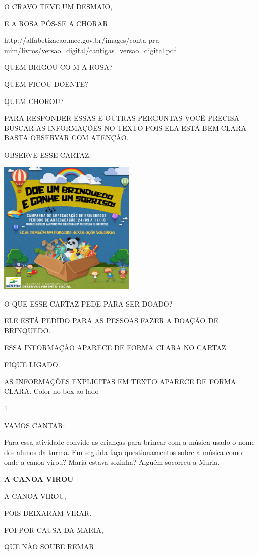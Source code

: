 {{{O CRAVO TEVE UM DESMAIO,

E A ROSA PÔS-SE A
CHORAR.

http://alfabetizacao.mec.gov.br/images/conta-pra-mim/livros/versao\_digital/cantigas\_versao\_digital.pdf

QUEM BRIGOU CO M A ROSA?

QUEM FICOU DOENTE?

QUEM CHOROU?

PARA RESPONDER ESSAS E OUTRAS PERGUNTAS VOCÊ PRECISA BUSCAR AS
INFORMAÇÕES NO TEXTO POIS ELA ESTÁ BEM CLARA BASTA OBSERVAR COM ATENÇÃO.

OBSERVE ESSE CARTAZ:

\includegraphics[width=2.57847in,height=2.52847in]{media/image82.png}

O QUE ESSE CARTAZ PEDE PARA SER DOADO?

ELE ESTÁ PEDIDO PARA AS PESSOAS FAZER A DOAÇÃO DE BRINQUEDO.

ESSA INFORMAÇÃO APARECE DE FORMA CLARA NO CARTAZ.

FIQUE LIGADO.

AS INFORMAÇÕES EXPLICITAS EM TEXTO APARECE DE FORMA CLARA. Color no box
ao lado


\num{1}

VAMOS CANTAR:

Para essa atividade convide as crianças para brincar com a música usado
o nome dos alunos da turma. Em seguida faça questionamentos sobre a
música como: onde a canoa virou? Maria estava sozinha? Alguém socorreu a
Maria.

\textbf{A CANOA VIROU}

A CANOA VIROU,

POIS DEIXARAM VIRAR.

FOI POR CAUSA DA MARIA,

QUE NÃO SOUBE REMAR.

}}}
